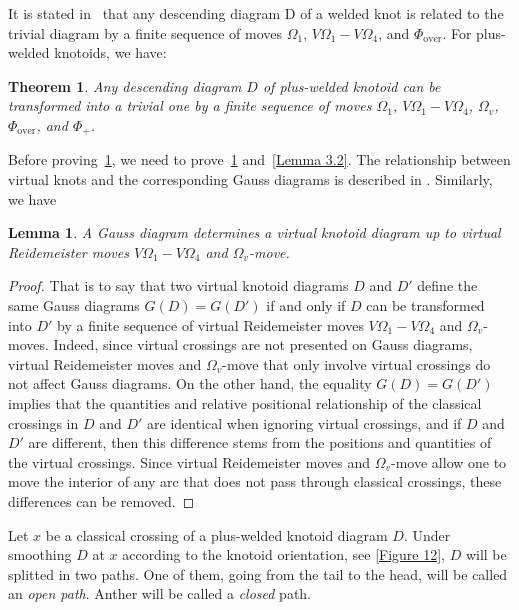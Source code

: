 \documentclass[11pt]{amsart}
\theoremstyle{noparens}
\newtheorem{theorem}{Theorem}[section]
\newtheorem{lemma}{Lemma}[section]
\numberwithin{equation}{section}
\numberwithin{equation}{section}
\begin{document}
It is stated in~\citep{satoh2018crossing} that any descending diagram D of a welded knot is related to the trivial diagram by a finite sequence of moves $\Omega_1$, $V\Omega_1-V\Omega_4$, and $\Phi_{\text{over}}$. For plus-welded  knotoids, we have:

\begin{theorem} \label{Theorem 3.1}
Any descending diagram $D$ of plus-welded  knotoid can be transformed into a trivial one by a finite sequence of moves $\Omega_1$, $V\Omega_1-V\Omega_4$, $\Omega_v$, $\Phi_{\text{over}}$, and $\Phi_+$.
\end{theorem}

Before proving~\cref{Theorem 3.1}, we need to prove~\cref{Lemma 3.1} and~\cref{Lemma 3.2}. The relationship between virtual knots and the corresponding Gauss diagrams is described in \citep{Goussarov2000Finite,satoh2018crossing}. Similarly, we have 

\begin{lemma} \label{Lemma 3.1}
A Gauss diagram determines a virtual knotoid diagram up to virtual Reidemeister moves $V\Omega_1 - V\Omega_4$ and $\Omega_v$-move.  
\end{lemma}

\begin{proof} 
That is to say that two virtual knotoid diagrams $D$ and $D'$ define the same Gauss diagrams $G(D) = G(D')$ if and only if $D$ can be transformed into $D'$ by a finite sequence of virtual Reidemeister moves $V\Omega_1 - V\Omega_4$ and $\Omega_v$-moves. 
Indeed, since virtual crossings are not presented on Gauss diagrams, virtual Reidemeister moves and $\Omega_v$-move that only involve virtual crossings do not affect Gauss diagrams. 
On the other hand, the equality $G(D) = G(D')$ implies that the quantities and relative positional relationship of the classical crossings in $D$ and $D'$ are identical when ignoring virtual crossings, and if $D$ and $D'$ are different, then this difference stems from the positions and quantities of the virtual crossings. Since virtual Reidemeister moves and $\Omega_v$-move allow one to move the interior of any arc that does not pass through classical crossings, these differences can be removed. 
\end{proof}

Let $x$ be a classical crossing of a plus-welded  knotoid diagram $D$. Under smoothing $D$ at $x$ according to the knotoid orientation, see \cref{Figure 12},  $D$ will be splitted in two paths. One of them, going from the tail to the head, will be called an \textit{open path}. Anther will be called a \textit{closed} path. 
\smallskip 
\end{document}
